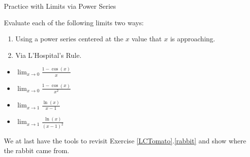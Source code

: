 \begin{exercise}{Practice with Limits via Power Series \Coffeecup \Coffeecup \Coffeecup}

Evaluate each of the following limits two ways:
\begin{enumerate}
\item Using a power series centered at the $x$ value that $x$ is approaching. 

\item Via L'Hospital's Rule.
\end{enumerate}

\begin{itemize}

\item $ \lim_{x\rightarrow 0} \frac{1-\cos(x)}{x}$

\vspace*{1in}

\item $ \lim_{x\rightarrow 0} \frac{1-\cos(x)}{x^2}$

\vspace*{1in}

\item $ \lim_{x\rightarrow 1} \frac{\ln(x)}{x-1}$

\vspace*{1in}

\item $ \lim_{x\rightarrow 1} \frac{\ln(x)}{(x-1)^2}$

\vspace*{1in}

\end{itemize}
\end{exercise}


We at last have the tools to revisit Exercise \ref{LCTomato}.\ref{rabbit} and show where the rabbit came from.

